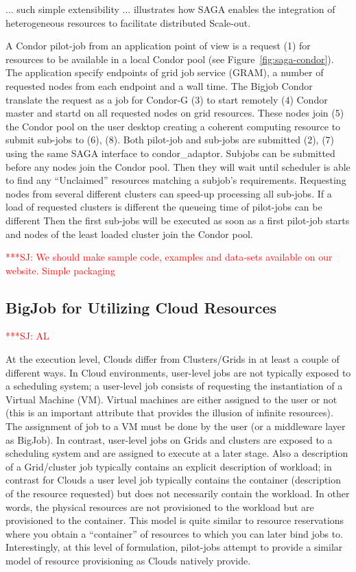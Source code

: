\documentclass[conference,final]{IEEEtran}
\newcommand{\jhanote}[1]{ {\textcolor{red} { ***SJ: #1 }}}
\newcommand{\jhanote}[1]{}
\begin{document}
... such simple extensibility ... illustrates how SAGA enables the
integration of heterogeneous resources to facilitate distributed
Scale-out.

A Condor pilot-job from an application point of view is a request (1)
for resources to be available in a local Condor pool (see Figure~\ref{fig:saga-condor}). 
The application specify endpoints of grid job service (GRAM), a number of
requested nodes from each endpoint and a wall time. The Bigjob Condor
translate the request as a job for Condor-G (3) to start remotely (4)
Condor master and startd on all requested nodes on grid
resources. These nodes join (5) the Condor pool on the user desktop
creating a coherent computing resource to submit sub-jobs to (6),
(8). Both pilot-job and sub-jobs are submitted (2), (7) using the same
SAGA interface to condor\_adaptor. Subjobs can be submitted before any
nodes join the Condor pool. Then they will wait until scheduler is
able to find any “Unclaimed” resources matching a subjob's
requirements. Requesting nodes from several different clusters can
speed-up processing all sub-jobs. If a load of requested clusters is
different the queueing time of pilot-jobs can be different Then the
first sub-jobs will be executed as soon as a first pilot-job starts
and nodes of the least loaded cluster join the Condor pool.

\jhanote{We should make sample code, examples and data-sets available
  on our website. Simple packaging}

\subsection{BigJob for Utilizing Cloud Resources} \jhanote{AL}


At the execution level, Clouds differ from Clusters/Grids in at least
a couple of different ways. In Cloud environments, user-level jobs are
not typically exposed to a scheduling system; a user-level job
consists of requesting the instantiation of a Virtual Machine (VM).
Virtual machines are either assigned to the user or not (this is an
important attribute that provides the illusion of infinite resources).
The assignment of job to a VM must be done by the user (or a
middleware layer as BigJob).  In contrast, user-level jobs on Grids
and clusters are exposed to a scheduling system and are assigned to
execute at a later stage.  Also a description of a Grid/cluster job
typically contains an explicit description of workload; in contrast
for Clouds a user level job typically contains the container
(description of the resource requested) but does not necessarily
contain the workload. In other words, the physical resources are not
provisioned to the workload but are provisioned to the container.
This model is quite similar to resource reservations where you obtain
a ``container'' of resources to which you can later bind jobs
to. Interestingly, at this level of formulation, pilot-jobs attempt to
provide a similar model of resource provisioning as Clouds natively
provide.
\end{document}
